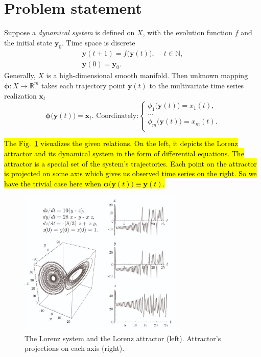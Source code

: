 \documentclass[referee, pdflatex, sn-mathphys-num]{sn-jnl}
\theoremstyle{definition}
\theoremstyle{plain}
\begin{document}
	\section{Problem statement}\label{sec:problem_statement}
	
	Suppose a \emph{dynamical system} is defined on $ X $, with the evolution function $ f $ and the initial state $ \mathbf{y}_0 $. Time space is discrete \begin{gather*}
		\mathbf{y}(t + 1) = f \bigl( \mathbf{y}(t) \bigr), \quad \ t \in \mathbb{N}, \\
		\mathbf{y}(0) = \mathbf{y}_0 .
	\end{gather*} Generally, $ X $ is a high-dimensional smooth manifold. Then unknown mapping $ \boldsymbol{\phi}: X \to \mathbb{R}^m $ takes each trajectory point $ \mathbf{y}(t) $ to the multivariate time series realization $ \mathbf{x}_t $ \begin{equation*}
		\boldsymbol{\phi} \bigl( \mathbf{y}(t) \bigr) = \mathbf{x}_t. \text{ Coordinately:} \begin{cases}
			\phi_1 \bigl( \mathbf{y}(t) \bigr) = x_1(t), \\
			\ldots \\
			\phi_m \bigl( \mathbf{y}(t) \bigr) = x_m(t). \\
		\end{cases}
	\end{equation*}
	
	\hl{The Fig.~{\ref{pic:attractor}} visualizes the given relations. On the left, it depicts the Lorenz attractor and its dynamical system in the form of differential equations. The attractor is a special set of the system's trajectories. Each point on the attractor is projected on some axis which gives us observed time series on the right. So we have the trivial case here when $\boldsymbol{\phi} \bigl( \mathbf{y}(t) \bigr) \equiv \mathbf{y}(t)$.}
	
	\begin{figure}[!htbp]
		\centering
		\includegraphics[width=0.7\textwidth, keepaspectratio]{attractor_3d.png}
		\caption{The Lorenz system and the Lorenz attractor (left). Attractor's projections on each axis (right).}\label{pic:attractor}
	\end{figure}
	
\end{document}
